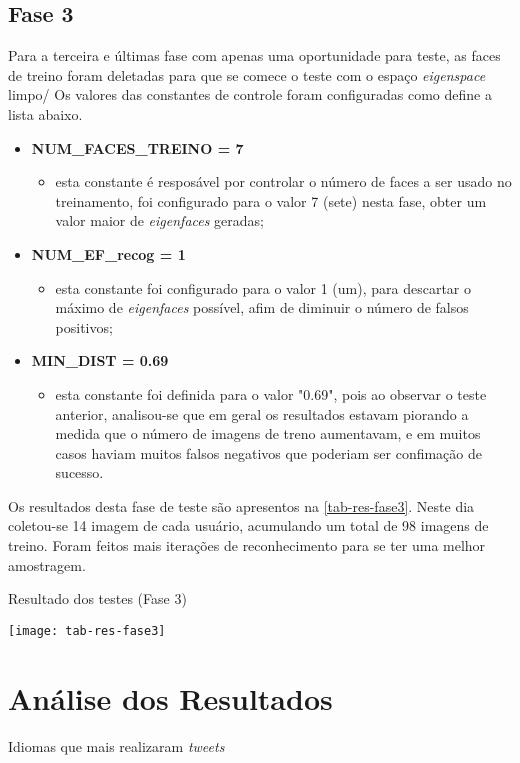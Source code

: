 \subsection{Fase 3}\label{ch:testresultfaz2}
Para a terceira e últimas fase com apenas uma oportunidade para teste, as faces de treino foram deletadas para que se comece o teste com o espaço \textit{eigenspace} limpo/ Os valores das constantes de controle foram configuradas como define a lista abaixo.

\begin{itemize}	
	\item \textbf{NUM\_FACES\_TREINO = 7}
	\begin{itemize}	
		\item esta constante é resposável por controlar o número de faces a ser usado no treinamento, foi configurado para o valor 7 (sete) nesta fase, obter um valor maior de \textit{eigenfaces} geradas;
	\end{itemize}
	
	\item \textbf{NUM\_EF\_recog = 1}
	\begin{itemize}	
		\item esta constante foi configurado para o valor 1 (um), para descartar o máximo de \textit{eigenfaces} possível, afim de diminuir o número de falsos positivos;
	\end{itemize}
	
	\item \textbf{MIN\_DIST = 0.69}
	\begin{itemize}	
		\item esta constante foi definida para o valor "0.69", pois ao observar o teste anterior, analisou-se que em geral os resultados estavam piorando a medida que o número de imagens de treno aumentavam, e em muitos casos haviam muitos falsos negativos que poderiam ser confimação de sucesso.
	\end{itemize}
\end{itemize}

Os resultados desta fase de teste são apresentos na \autoref{tab-res-fase3}. Neste dia coletou-se 14 imagem de cada usuário, acumulando um total de 98 imagens de treino. Foram feitos mais iterações de reconhecimento para se ter uma melhor amostragem.

\begin{table}[h]
	\centering
	\caption{Resultado dos testes (Fase 3) }
	\texttt{[image: tab-res-fase3]}
	\label{tab-res-fase3}
\end{table}





\section{Análise dos Resultados}\label{ch:analresult}







\begin{grafico}[h]
	\centering
	\caption{Idiomas que mais realizaram \textit{tweets}}
	\label{lingua}
\end{grafico}









